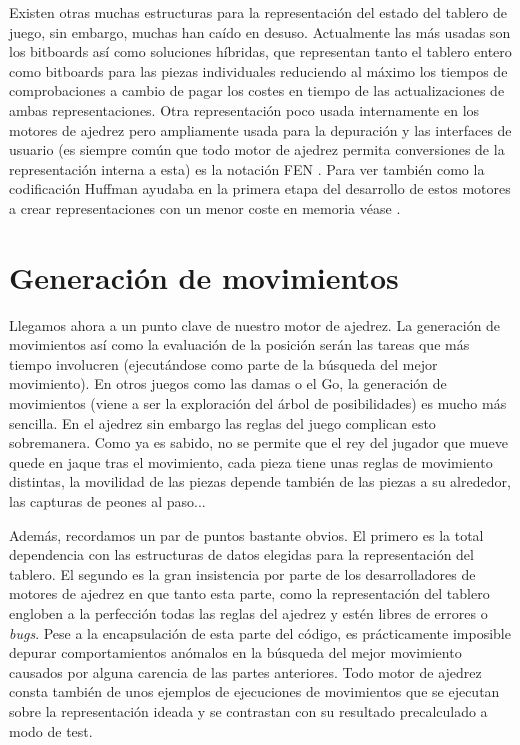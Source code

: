 \documentclass[letterpaper,12pt]{article}
\begin{document}
Existen otras muchas estructuras para la representación del estado del tablero de juego,
sin embargo, muchas han caído en desuso. Actualmente las más usadas son los bitboards así
como soluciones híbridas, que representan tanto el tablero entero como bitboards para las
piezas individuales reduciendo al máximo los tiempos de comprobaciones a cambio de pagar
los costes en tiempo de las actualizaciones de ambas representaciones. Otra representación
poco usada internamente en los motores de ajedrez pero ampliamente usada para la 
depuración y las interfaces de usuario (es siempre común que todo motor de ajedrez permita
conversiones de la representación interna a esta) es la notación FEN \cite{Intro6}. Para
ver también como la codificación Huffman ayudaba en la primera etapa del desarrollo de 
estos motores a crear representaciones con un menor coste en memoria véase 
\cite{BoardRepresentation3}.
    

\section{Generación de movimientos}

Llegamos ahora a un punto clave de nuestro motor de ajedrez. La generación de movimientos
así como la evaluación de la posición serán las tareas que más tiempo involucren 
(ejecutándose como parte de la búsqueda del mejor movimiento). En otros juegos como las
damas o el Go, la generación de movimientos (viene a ser la exploración del árbol de 
posibilidades) es mucho más sencilla. En el ajedrez sin embargo las reglas del juego
complican esto sobremanera. Como ya es sabido, no se permite que el rey del jugador que
mueve quede en jaque tras el movimiento, cada pieza tiene unas reglas de movimiento 
distintas, la movilidad de las piezas depende también de las piezas a su alrededor, las
capturas de peones al paso... 

Además, recordamos un par de puntos bastante obvios. El primero es la total 
dependencia con las estructuras de datos elegidas para la representación del tablero.
El segundo es la gran insistencia por parte de los desarrolladores de motores de 
ajedrez en que tanto esta parte, como la representación del tablero engloben a la 
perfección todas las reglas del ajedrez y estén libres de errores o \textit{bugs}.
Pese a la encapsulación de esta parte del código, es prácticamente imposible depurar
comportamientos anómalos en la búsqueda del mejor movimiento causados por alguna carencia
de las partes anteriores. Todo motor de ajedrez consta también de unos ejemplos de 
ejecuciones de movimientos que se ejecutan sobre la representación ideada y se contrastan 
con su resultado precalculado a modo de test.
\end{document}

